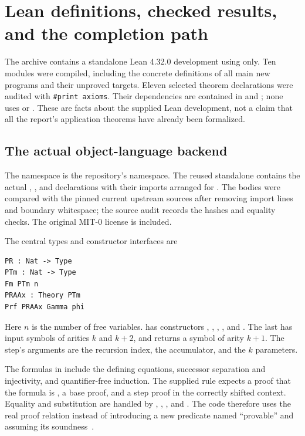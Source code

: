 \section{Lean definitions, checked results, and the completion path}
\label{sec:lean}

The archive contains a standalone Lean 4.32.0 development using 
only. Ten modules were compiled, including the concrete definitions of
all main new programs and their unproved targets. Eleven selected theorem
declarations were audited with \texttt{\#print axioms}. Their dependencies
are contained in  and ; none uses
 or . These are facts about the
supplied Lean development, not a claim that all the report's application
theorems have already been formalized.

\subsection{The actual object-language backend}

The namespace  is the repository's namespace.
The reused standalone  contains the actual
, , and  declarations with their
imports arranged for . The bodies were compared with the
pinned current upstream sources after removing import lines and
boundary whitespace; the source audit records the hashes and equality
checks. The original MIT-0 license is included.

The central types and constructor interfaces are
\begin{lstlisting}
PR : Nat -> Type
PTm : Nat -> Type
Fm PTm n
PRAAx : Theory PTm
Prf PRAAx Gamma phi
\end{lstlisting}
Here \(n\) is the number of free variables.  has constructors
, , , , and .
The last has input symbols of arities \(k\) and \(k+2\), and returns
a symbol of arity \(k+1\). The step's arguments are the recursion index,
the accumulator, and the \(k\) parameters.

The formulas in  include the defining equations, successor
separation and injectivity, and quantifier-free induction. The supplied
 rule expects a proof that the formula is
, a base proof, and a step proof in the correctly shifted
context. Equality and substitution are handled by
, , , and
. The code therefore uses the real proof relation
instead of introducing a new predicate named ``provable'' and assuming
its soundness~\cite{repo-pr}.

